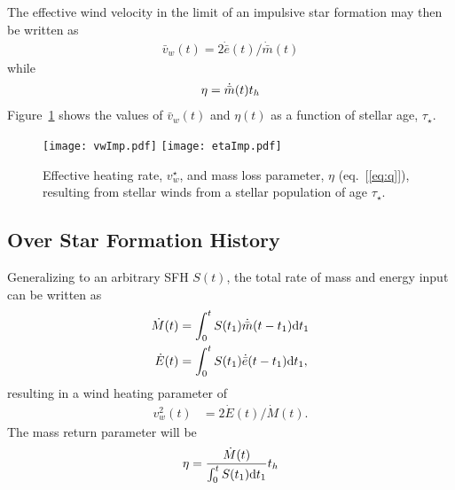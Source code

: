 The effective wind velocity in the limit of an impulsive star
formation may then be written as
\begin{align}
\bar{v}_w(t)=2 \dot{\bar{e}}(t)/\dot{\bar{m}}(t)
\label{eq:vwImp}
\end{align}
while 
\begin{align}
\eta = \dot{\bar{m}}(t) t_h
\label{eq:etaImp}
\end{align}
 Figure~\ref{fig:vwImp} shows the values of $\bar{v}_w(t)$ and $\eta(t)$ as a function of stellar age, $\tau_{\star}$.

\begin{figure}
\texttt{[image: vwImp.pdf]}
\texttt{[image: etaImp.pdf]}
\caption{\label{fig:vwImp} Effective heating rate, $v_w^{\star}$, and mass loss parameter, $\eta$ (eq.~[\ref{eq:q}]), resulting from stellar winds from a stellar population of age $\tau_{\star}$.}
\end{figure}



\subsection{Over Star Formation History}
Generalizing to an arbitrary SFH $S(t)$, the total rate of mass and energy input can be written as
\begin{align} 
  \dot{M}(t) &= \int_0^t S(t_1) \dot{\bar{m}}(t-t_1){\rm
      d}t_1 \label{eq:MDotSFH}\\
  \dot{E}(t) &= \int_0^t S(t_1) \dot{\bar{e}}(t-t_1){\rm
      d}t_1, \label{eq:EDotSFH}
\end{align}
resulting in a wind heating parameter of 
\begin{align}
  v_w^2(t) &=2 \dot{E}(t)/\dot{M}(t).
\end{align}
The mass return parameter will be
\begin{align}
\eta = \frac{\dot{M}(t)}{\int_0^t S(t_1) {\rm d}t_1} t_h
\end{align}

